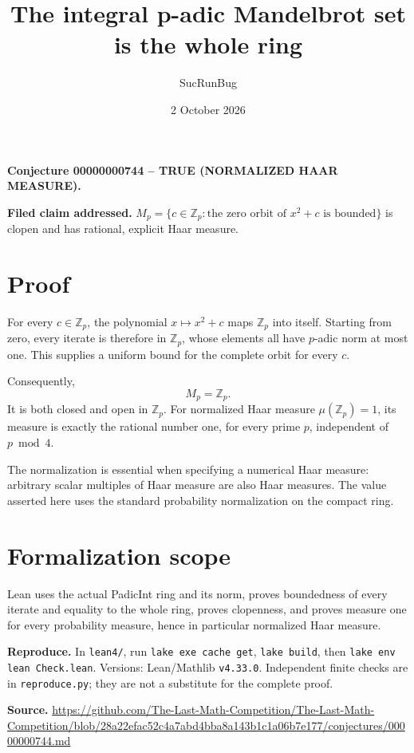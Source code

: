 \documentclass[11pt]{article}
\title{The integral p-adic Mandelbrot set is the whole ring}
\author{SucRunBug}
\date{2 October 2026}
\begin{document}
\maketitle
\textbf{Conjecture 00000000744 -- TRUE (NORMALIZED HAAR MEASURE).}

\textbf{Filed claim addressed.} $M_p=\{c\in\mathbb Z_p:\text{the zero orbit of }x^2+c\text{ is bounded}\}$ is clopen and has rational, explicit Haar measure.

\section*{Proof}
For every $c\in\mathbb Z_p$, the polynomial $x\mapsto x^2+c$ maps $\mathbb Z_p$ into itself. Starting from zero, every iterate is therefore in $\mathbb Z_p$, whose elements all have $p$-adic norm at most one. This supplies a uniform bound for the complete orbit for every $c$.

Consequently,
\[M_p=\mathbb Z_p.\]
It is both closed and open in $\mathbb Z_p$. For normalized Haar measure $\mu(\mathbb Z_p)=1$, its measure is exactly the rational number one, for every prime $p$, independent of $p\bmod4$.

The normalization is essential when specifying a numerical Haar measure: arbitrary scalar multiples of Haar measure are also Haar measures. The value asserted here uses the standard probability normalization on the compact ring.

\section*{Formalization scope}
Lean uses the actual PadicInt ring and its norm, proves boundedness of every iterate and equality to the whole ring, proves clopenness, and proves measure one for every probability measure, hence in particular normalized Haar measure.

\textbf{Reproduce.} In \texttt{lean4/}, run \texttt{lake exe cache get},
\texttt{lake build}, then \texttt{lake env lean Check.lean}. Versions:
Lean/Mathlib \texttt{v4.33.0}. Independent finite checks are in
\texttt{reproduce.py}; they are not a substitute for the complete proof.

\textbf{Source.} \url{https://github.com/The-Last-Math-Competition/The-Last-Math-Competition/blob/28a22efac52c4a7abd4bba8a143b1c1a06b7e177/conjectures/00000000744.md}
\end{document}

